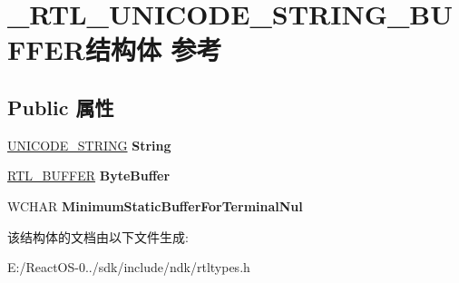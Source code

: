 \hypertarget{struct___r_t_l___u_n_i_c_o_d_e___s_t_r_i_n_g___b_u_f_f_e_r}{}\section{\+\_\+\+R\+T\+L\+\_\+\+U\+N\+I\+C\+O\+D\+E\+\_\+\+S\+T\+R\+I\+N\+G\+\_\+\+B\+U\+F\+F\+E\+R结构体 参考}
\label{struct___r_t_l___u_n_i_c_o_d_e___s_t_r_i_n_g___b_u_f_f_e_r}
\subsection*{Public 属性}
\begin{DoxyCompactItemize}
\item 
\mbox{\label{struct___r_t_l___u_n_i_c_o_d_e___s_t_r_i_n_g___b_u_f_f_e_r_afca5a64c91c1c8246bf9752dd4cd41d3}} 
\hyperlink{struct___u_n_i_c_o_d_e___s_t_r_i_n_g}{U\+N\+I\+C\+O\+D\+E\+\_\+\+S\+T\+R\+I\+NG} {\bfseries String}
\item 
\mbox{\label{struct___r_t_l___u_n_i_c_o_d_e___s_t_r_i_n_g___b_u_f_f_e_r_afb1a939dfe8ad2d85279c5c457170e03}} 
\hyperlink{struct___r_t_l___b_u_f_f_e_r}{R\+T\+L\+\_\+\+B\+U\+F\+F\+ER} {\bfseries Byte\+Buffer}
\item 
\mbox{\label{struct___r_t_l___u_n_i_c_o_d_e___s_t_r_i_n_g___b_u_f_f_e_r_ac1bab47c563a28e855adafa478968db4}} 
W\+C\+H\+AR {\bfseries Minimum\+Static\+Buffer\+For\+Terminal\+Nul}
\end{DoxyCompactItemize}


该结构体的文档由以下文件生成\+:\begin{DoxyCompactItemize}
\item 
E\+:/\+React\+O\+S-\/0../sdk/include/ndk/rtltypes.\+h\end{DoxyCompactItemize}
